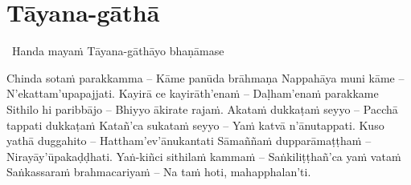 \section{Tāyana-gāthā}
\label{tayana-gatha}

\begin{intro}
  \anglebracketleft\ \hspace{-0.5mm}Handa mayaṁ Tāyana-gāthāyo bhaṇāmase \hspace{-0.5mm}\anglebracketright\
\end{intro}

Chinda sotaṁ parakkamma – Kāme panūda brāhmaṇa
Nappahāya muni kāme – N'ekattam'upapajjati.
Kayirā ce kayirāth'enaṁ – Daḷham'enaṁ parakkame
Sithilo hi paribbājo – Bhiyyo ākirate rajaṁ.
Akataṁ dukkaṭaṁ seyyo – Pacchā tappati dukkaṭaṁ
Katañ'ca sukataṁ seyyo – Yaṁ katvā n'ānutappati.
Kuso yathā duggahito – Hattham'ev'ānukantati
Sāmaññaṁ dupparāmaṭṭhaṁ – Nirayāy'ūpakaḍḍhati.
Yaṅ-kiñci sithilaṁ kammaṁ – Saṅkiliṭṭhañ'ca yaṁ vataṁ
Saṅkassaraṁ brahmacariyaṁ – Na taṁ hoti, mahapphalan'ti.

\clearpage
